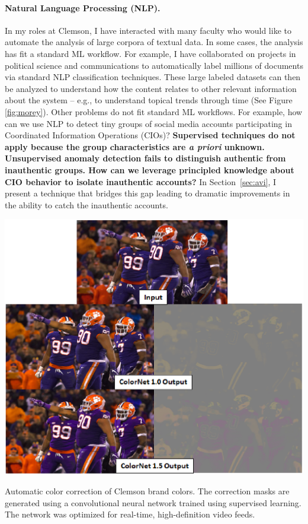 \documentclass{tufte-handout}
\begin{document}
\paragraph{Natural Language Processing (NLP).} In my roles at Clemson, I have interacted with many faculty who would like to automate the analysis of large corpora of textual data. In some cases, the analysis has fit a standard ML workflow. For example, I have collaborated on projects in political science \citep{fine2019content} and communications \citep{ehrett_2021_sscr,cranmer2023social} to automatically label millions of documents via standard NLP classification techniques. These large labeled datasets can then be analyzed to understand how the content relates to other relevant information about the system – e.g., to understand topical trends through time (See Figure \ref{fig:morey}). Other problems do not fit standard ML workflows. For example, how can we use NLP to detect tiny groups of social media accounts participating in Coordinated Information Operations (CIOs)? {\bf Supervised techniques do not apply because the group characteristics are {\it a priori} unknown. Unsupervised anomaly detection fails to distinguish authentic from inauthentic groups. How can we leverage principled knowledge about CIO behavior to isolate inauthentic accounts?} In Section~\ref{sec:avi}, I present a technique that bridges this gap leading to dramatic improvements in the ability to catch the inauthentic accounts.

\begin{marginfigure}%
  \includegraphics[width=\linewidth]{colornet}
  \caption{Automatic color correction of Clemson brand colors. The correction masks are generated using a convolutional neural network trained using supervised learning. The network was optimized for real-time, high-definition video feeds.}
  \label{fig:colornet}
\end{marginfigure}
\end{document}
